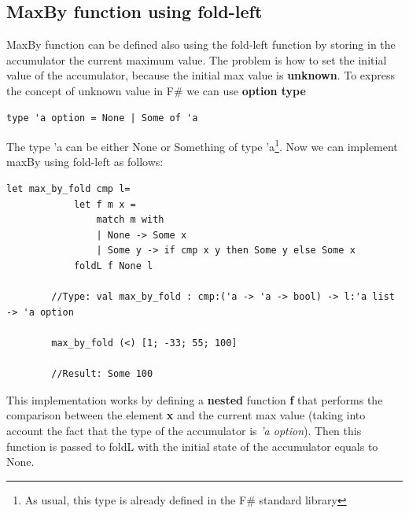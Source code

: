     \subsection{MaxBy function using fold-left}
    MaxBy function can be defined also using the fold-left function by storing in the accumulator the current maximum value. The problem is how to set the initial value of the accumulator, because the initial max value is \textbf{unknown}. To express the concept of unknown value in F\# we can use \textbf{option type}
    \begin{lstlisting}[style = FSharpStyle]
        type 'a option = None | Some of 'a
    \end{lstlisting}
    The type 'a can be either None or Something of type 'a\footnote{As usual, this type is already defined in the F\# standard library}.\newline\newline
    Now we can implement maxBy using fold-left as follows:
    \begin{lstlisting}[style = FSharpStyle]
        let max_by_fold cmp l=
            let f m x = 
                match m with
                | None -> Some x
                | Some y -> if cmp x y then Some y else Some x
            foldL f None l

        //Type: val max_by_fold : cmp:('a -> 'a -> bool) -> l:'a list -> 'a option 
        
        max_by_fold (<) [1; -33; 55; 100] 

        //Result: Some 100
    \end{lstlisting}
    This implementation works by defining a \textbf{nested} function \textbf{f} that performs the comparison between the element \textbf{x} and the current max value (taking into account the fact that the type of the accumulator is \textit{'a option}). Then this function is passed to foldL with the initial state of the accumulator equals to None. 

